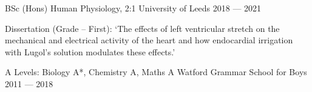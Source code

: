 
\begin{cventries}
  \cventry
  {BSc (Hons) Human Physiology, 2:1}
  {University of Leeds}
  {}
  {2018 --- 2021}
  {
    \begin{cvitems}
      \item {Dissertation (Grade -- First): `The effects of left ventricular stretch on the mechanical and electrical activity of the heart and how endocardial irrigation with Lugol's solution modulates these effects.'}
    \end{cvitems}
  }

  \cventry
  {A Levels: Biology A*, Chemistry A, Maths A}
  {Watford Grammar School for Boys}
  {}
  {2011 --- 2018}
  {}
\end{cventries}
